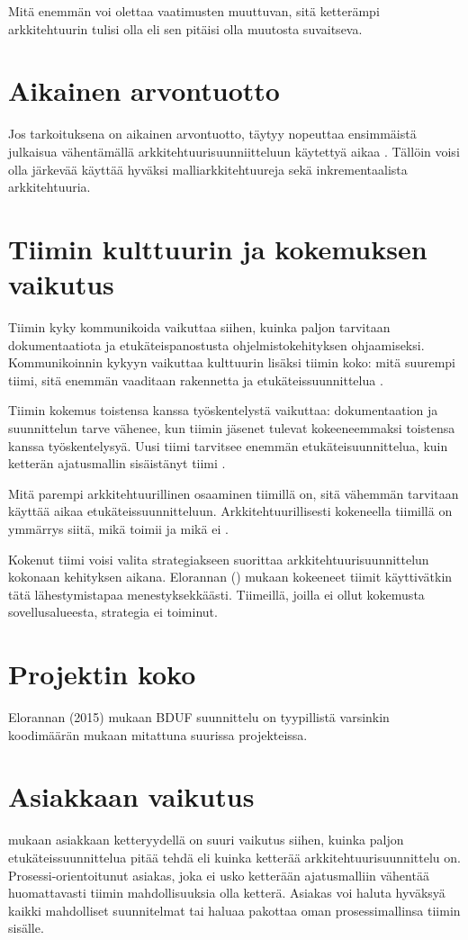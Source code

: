 Mitä enemmän voi olettaa vaatimusten muuttuvan, sitä ketterämpi arkkitehtuurin tulisi olla eli sen pitäisi olla muutosta suvaitseva.

\section{Aikainen arvontuotto}

Jos tarkoituksena on aikainen arvontuotto, täytyy nopeuttaa ensimmäistä julkaisua vähentämällä arkkitehtuurisuunniitteluun käytettyä aikaa \citep{waterman_how_2015}. Tällöin voisi olla järkevää käyttää hyväksi malliarkkitehtuureja sekä inkrementaalista arkkitehtuuria.

\section{Tiimin kulttuurin ja kokemuksen vaikutus}
Tiimin kyky kommunikoida vaikuttaa siihen, kuinka paljon tarvitaan dokumentaatiota ja etukäteispanostusta ohjelmistokehityksen ohjaamiseksi. Kommunikoinnin kykyyn vaikuttaa kulttuurin lisäksi tiimin koko: mitä suurempi tiimi, sitä enemmän vaaditaan rakennetta ja etukäteissuunnittelua \citep{waterman_how_2015}.

Tiimin kokemus toistensa kanssa työskentelystä vaikuttaa: dokumentaation ja suunnittelun tarve vähenee, kun tiimin jäsenet tulevat kokeeneemmaksi toistensa kanssa työskentelysyä. Uusi tiimi tarvitsee enemmän etukäteisuunnittelua, kuin ketterän ajatusmallin sisäistänyt tiimi \citep{waterman_how_2015}.

Mitä parempi arkkitehtuurillinen osaaminen tiimillä on, sitä vähemmän tarvitaan käyttää aikaa etukäteissuunnitteluun. Arkkitehtuurillisesti kokeneella tiimillä on ymmärrys siitä, mikä toimii ja mikä ei \citep{waterman_how_2015}. 

Kokenut tiimi voisi valita strategiakseen suorittaa arkkitehtuurisuunnittelun kokonaan kehityksen aikana. Elorannan (\citeyear{eloranta2015techniques}) mukaan kokeeneet tiimit käyttivätkin tätä lähestymistapaa menestyksekkäästi. Tiimeillä, joilla ei ollut kokemusta sovellusalueesta, strategia ei toiminut.
\section{Projektin koko}

Elorannan (2015) mukaan BDUF suunnittelu on tyypillistä varsinkin koodimäärän mukaan mitattuna suurissa projekteissa. 

\section{Asiakkaan vaikutus}
\citep{waterman_how_2015} mukaan asiakkaan ketteryydellä on suuri vaikutus siihen, kuinka paljon etukäteissuunnittelua pitää tehdä eli kuinka ketterää arkkitehtuurisuunnittelu on. Prosessi-orientoitunut asiakas, joka ei usko ketterään ajatusmalliin vähentää huomattavasti tiimin mahdollisuuksia olla ketterä. Asiakas voi haluta hyväksyä kaikki mahdolliset suunnitelmat tai haluaa pakottaa oman prosessimallinsa tiimin sisälle. 

